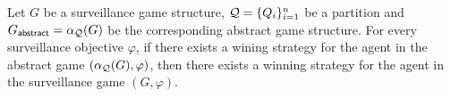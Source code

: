 \begin{theorem}
Let $G$ be a surveillance game structure, $\mathcal{Q} = \{Q_i\}_{i=1}^n$ be a partition and $G_{\mathsf{abstract}} = \alpha_{\mathcal{Q}}(G)$ be the corresponding abstract game structure. For every surveillance objective $\varphi$, if there exists a wining strategy for the agent in the abstract game $(\alpha_{\mathcal{Q}}(G),\varphi)$, then there exists a winning strategy for the agent in the surveillance game $(G,\varphi)$.
\end{theorem}

